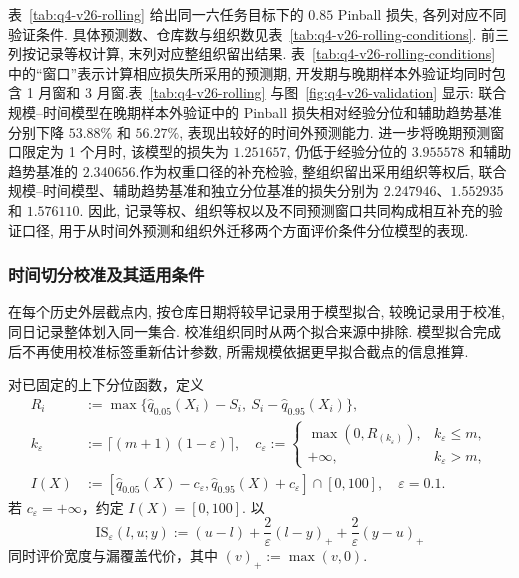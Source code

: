 表~\ref{tab:q4-v26-rolling} 给出同一六任务目标下的 $0.85$ Pinball 损失, 各列对应不同验证条件. 具体预测数、仓库数与组织数见表~\ref{tab:q4-v26-rolling-conditions}. 前三列按记录等权计算, 末列对应整组织留出结果. 表~\ref{tab:q4-v26-rolling-conditions} 中的“窗口”表示计算相应损失所采用的预测期, 开发期与晚期样本外验证均同时包含 1 月窗和 3 月窗.表~\ref{tab:q4-v26-rolling} 与图~\ref{fig:q4-v26-validation} 显示: 联合规模--时间模型在晚期样本外验证中的 Pinball 损失相对经验分位和辅助趋势基准分别下降 $53.88\%$ 和 $56.27\%$, 表现出较好的时间外预测能力. 进一步将晚期预测窗口限定为 1 个月时, 该模型的损失为 $1.251657$, 仍低于经验分位的 $3.955578$ 和辅助趋势基准的 $2.340656$.作为权重口径的补充检验, 整组织留出采用组织等权后, 联合规模--时间模型、辅助趋势基准和独立分位基准的损失分别为 $2.247946$、$1.552935$ 和 $1.576110$. 因此, 记录等权、组织等权以及不同预测窗口共同构成相互补充的验证口径, 用于从时间外预测和组织外迁移两个方面评价条件分位模型的表现.




\subsubsection{时间切分校准及其适用条件}
在每个历史外层截点内, 按仓库日期将较早记录用于模型拟合, 较晚记录用于校准, 同日记录整体划入同一集合. 校准组织同时从两个拟合来源中排除. 模型拟合完成后不再使用校准标签重新估计参数, 所需规模依据更早拟合截点的信息推算.

\begin{definition}[分位带的校准分数与区间分数]\label{def:q4-calibration}
对已固定的上下分位函数，定义
\begin{subequations}
    \begin{align}\label{eq:q4-cqr}
R_i&:=\max\{\widehat q_{0.05}(X_i)-S_i,\ S_i-\widehat q_{0.95}(X_i)\},\\
k_\varepsilon&:=\lceil(m+1)(1-\varepsilon)\rceil,
\quad c_\varepsilon:=\begin{cases}\max(0,R_{(k_\varepsilon)}),&k_\varepsilon\le m,\\+\infty,&k_\varepsilon>m,\end{cases}\\
I(X)&:=[\widehat q_{0.05}(X)-c_\varepsilon,
\widehat q_{0.95}(X)+c_\varepsilon]\cap[0,100],\quad\varepsilon=0.1.
\end{align}
\end{subequations}
若 $c_\varepsilon=+\infty$，约定 $I(X)=[0,100]$. 以
\begin{equation}\label{eq:q4-interval-score}
\mathrm{IS}_{\varepsilon}(l,u;y):=(u-l)
+\frac2\varepsilon(l-y)_++\frac2\varepsilon(y-u)_+
\end{equation}
同时评价宽度与漏覆盖代价，其中 $(v)_+:=\max(v,0)$. 
\end{definition}

